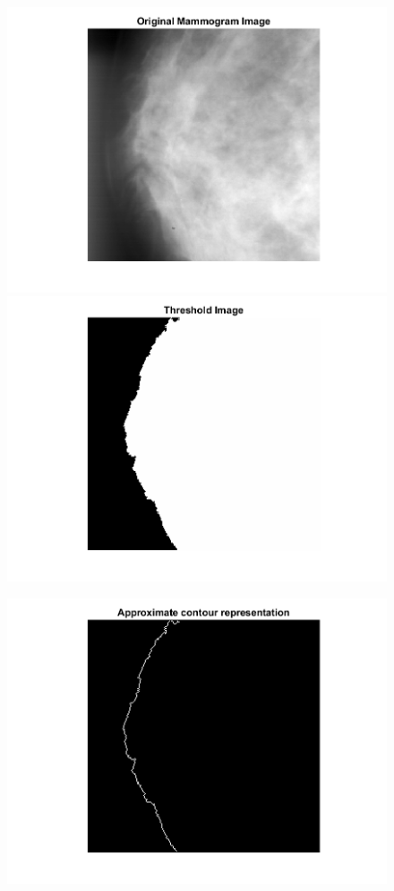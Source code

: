 \documentclass[11pt]{article} %
\begin{document}
\begin{figure}
 \centering
\includegraphics{Original Mammogram.png}
\includegraphics{Thresholded Mammogram.png}

\end{figure}
\begin{figure}
\centering
\includegraphics{Approximate Contour.png}
\end{figure}
\end{document}
